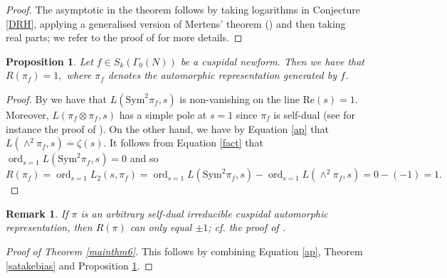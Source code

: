 \documentclass[12pt,reqno]{amsart}
\newtheorem{proposition}[theorem]{Proposition}
\newtheorem{remark}[theorem]{Remark}
\theoremstyle{definition}
\numberwithin{equation}{section}
\newcommand{\ord}{\mathop{\mathrm{ord}}}
\begin{document}
\begin{proof}
The asymptotic in the theorem follows by taking logarithms in Conjecture \ref{DRH}, applying a generalised version of Mertens' theorem (\cite[Lemma 3.6]{Sheth24B}) and then taking real parts; we refer to the proof of \cite[Theorem 4.1]{Sheth24B} for more details. 
\end{proof}





\begin{proposition} \label{secondmoment}
Let $f \in S_k(\Gamma_0(N))$ be a cuspidal newform. Then we have that 
$
R(\pi_f) = 1, 
$
where $\pi_f$ denotes the automorphic representation generated by $f$. 
\end{proposition}




\begin{proof}
By \cite[Theorem 1.1]{Sha97} we have that $L(\text{Sym}^2 \pi_f, s)$  is non-vanishing on the line $\textrm{Re}(s)=1$. Moreover, $L( \pi_f \otimes  \pi_f, s)$ has a simple pole at $s=1$ since $\pi_f$ is self-dual (see for instance the proof of \cite[Theorem 3.4]{Devin2020}). On the other hand, we have by Equation \eqref{ap} that $L(\wedge^2 \pi_f, s) \overset{.}=\zeta(s)$. It follows from Equation \eqref{fact} that $ \ord_{s=1} L(\text{Sym}^2  \pi_f, s)=0$ and so
$\displaystyle{
R(\pi_f)= \ord_{s=1} L_2(s, \pi_f) = \ord_{s=1} L(\text{Sym}^2  \pi_f, s)-  \ord_{s=1} L(\wedge^2  \pi_f, s) = 0-(-1)=1.}$ 
\end{proof}

\begin{remark}
If $\pi$ is an arbitrary self-dual irreducible cuspidal automorphic representation, then  $R(\pi)$ can only equal $\pm 1$; cf. the proof of \cite[Theorem 3.4]{Devin2020}. 
\end{remark}


\begin{proof}[Proof of Theorem \ref{mainthm6}]
This follows by combining Equation \eqref{ap}, Theorem \ref{satakebias} and Proposition \ref{secondmoment}.
\end{proof}

\end{document}
